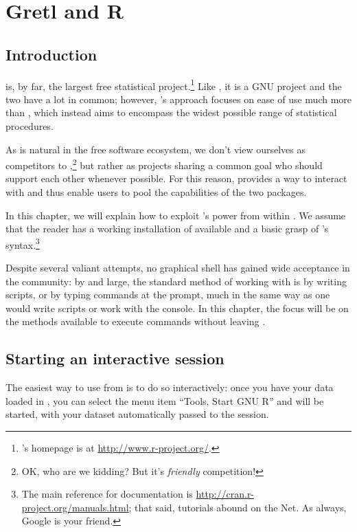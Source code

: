 \chapter{Gretl and R}
\label{gretlR}

\section{Introduction}
\label{R-intro}

 is, by far, the largest free statistical
project.\footnote{'s homepage is at
  \url{http://www.r-project.org/}.} Like , it is a GNU
project and the two have a lot in common; however, 's
approach focuses on ease of use much more than , which instead
aims to encompass the widest possible range of statistical procedures.

As is natural in the free software ecosystem, we don't view ourselves
as competitors to ,\footnote{OK, who are we kidding? But it's
  \emph{friendly} competition!} but rather as projects sharing a common
goal who should support each other whenever possible. For this reason,
 provides a way to interact with  and thus enable
users to pool the capabilities of the two packages.

In this chapter, we will explain how to exploit 's power from
within . We assume that the reader has a working
installation of  available and a basic grasp of 's
syntax.\footnote{The main reference for  documentation is
  \url{http://cran.r-project.org/manuals.html}; that said, 
  tutorials abound on the Net. As always, Google is your friend.}

Despite several valiant attempts, no graphical shell has gained wide
acceptance in the  community: by and large, the standard method
of working with  is by writing scripts, or by typing commands
at the  prompt, much in the same way as one would write
 scripts or work with the  console. In this
chapter, the focus will be on the methods available to execute 
commands without leaving .

\section{Starting an interactive  session}
\label{sec:R-interactive}


The easiest way to use  from  is to do so
interactively: once you have your data loaded in , you can
select the menu item ``Tools, Start GNU R'' and  will be
started, with your dataset automatically passed to the 
session.

